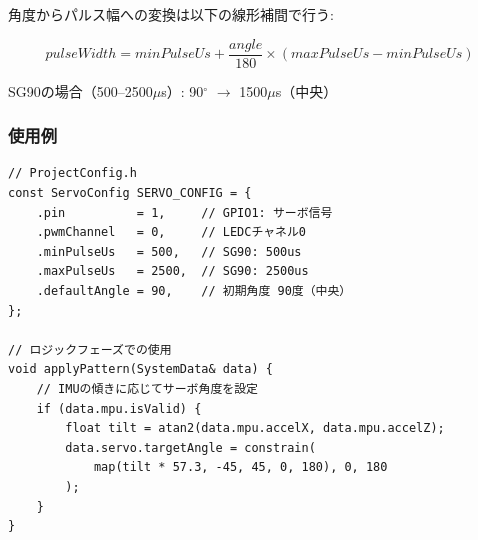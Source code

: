 \begin{notebox}[角度→パルス幅変換]
角度からパルス幅への変換は以下の線形補間で行う:

\vspace{0.3em}
$$pulseWidth = minPulseUs + \frac{angle}{180} \times (maxPulseUs - minPulseUs)$$
\vspace{0.3em}

\noindent SG90の場合（500--2500$\mu$s）: 90$^{\circ}$ $\rightarrow$ 1500$\mu$s（中央）
\end{notebox}

\subsubsection{使用例}

\begin{lstlisting}[style=cppstyle, caption={ServoModuleの使用例}]
// ProjectConfig.h
const ServoConfig SERVO_CONFIG = {
    .pin          = 1,     // GPIO1: サーボ信号
    .pwmChannel   = 0,     // LEDCチャネル0
    .minPulseUs   = 500,   // SG90: 500us
    .maxPulseUs   = 2500,  // SG90: 2500us
    .defaultAngle = 90,    // 初期角度 90度（中央）
};

// ロジックフェーズでの使用
void applyPattern(SystemData& data) {
    // IMUの傾きに応じてサーボ角度を設定
    if (data.mpu.isValid) {
        float tilt = atan2(data.mpu.accelX, data.mpu.accelZ);
        data.servo.targetAngle = constrain(
            map(tilt * 57.3, -45, 45, 0, 180), 0, 180
        );
    }
}
\end{lstlisting}

